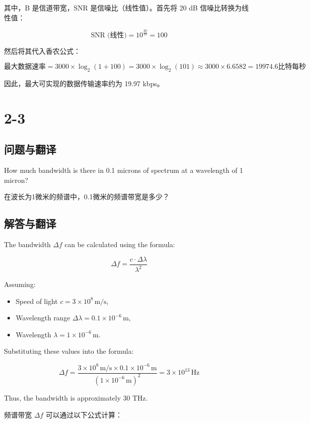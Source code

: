 其中，B 是信道带宽，SNR 是信噪比（线性值）。首先将 20 dB 信噪比转换为线性值：

\[
\text{SNR (线性)} = 10^{\frac{20}{10}} = 100
\]

然后将其代入香农公式：

\[
\text{最大数据速率} = 3000 \times \log_2(1 + 100) = 3000 \times \log_2(101) \approx 3000 \times 6.6582 = 19974.6 \text{比特每秒}
\]

因此，最大可实现的数据传输速率约为 19.97 kbps。

\section{2-3}

\subsection{问题与翻译}

How much bandwidth is there in 0.1 microns of spectrum at a wavelength of 1 micron?

在波长为1微米的频谱中，0.1微米的频谱带宽是多少？

\subsection{解答与翻译}

The bandwidth \(\Delta f\) can be calculated using the formula:

\[
\Delta f = \frac{c \cdot \Delta \lambda}{\lambda^2}
\]

Assuming:
\begin{itemize}
    \item Speed of light \(c = 3 \times 10^8 \, \text{m/s}\),
    \item Wavelength range \(\Delta \lambda = 0.1 \times 10^{-6} \, \text{m}\),
    \item Wavelength \(\lambda = 1 \times 10^{-6} \, \text{m}\).
\end{itemize}

Substituting these values into the formula:

\[
\Delta f = \frac{3 \times 10^8 \, \text{m/s} \times 0.1 \times 10^{-6} \, \text{m}}{(1 \times 10^{-6} \, \text{m})^2} = 3 \times 10^{13} \, \text{Hz}
\]

Thus, the bandwidth is approximately 30 THz.

\vspace{10pt}

频谱带宽 \(\Delta f\) 可以通过以下公式计算：

